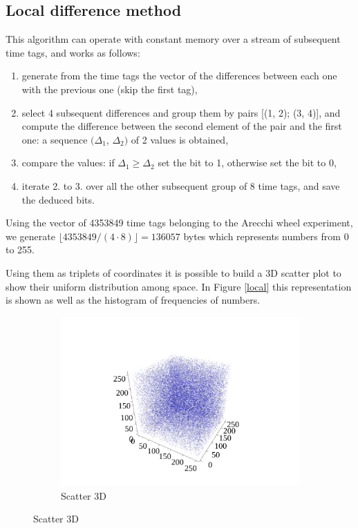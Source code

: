 \documentclass[10pt, final]{article}
\begin{document}
\begin{multicols}{2}
\subsection*{Local difference method}
This algorithm can operate with constant memory over a stream of subsequent time tags, and works as follows:
\begin{enumerate}
    \item generate from the time tags the vector of the differences between each one with the previous one (skip the first tag), 
    \item select 4 subsequent differences and group them by pairs [(1, 2); (3, 4)], and compute the difference between the second element of the pair and the first one: a sequence $(\Delta_1$, $\Delta_2)$ of 2 values is obtained,
    \item compare the values: if $\Delta_1 \geq \Delta_2$ set the bit to 1, otherwise set the bit to 0, 
    \item iterate 2. to 3. over all the other subsequent group of 8 time tags, and save the deduced bits.
\end{enumerate}
Using the vector of 4353849 time tags belonging to the Arecchi wheel experiment, we generate $\lfloor4353849/(4\cdot 8)\rfloor = 136057$ bytes which represents numbers from 0 to 255.

Using them as triplets of coordinates it is possible to build a 3D scatter plot to show their uniform distribution among space. In Figure \ref{local} this representation is shown as well as the histogram of frequencies of numbers.
\begin{mdframed}
    \begin{figure}[H]
        \begin{subfigure}{\textwidth}
            \centering
            \includegraphics[width = \textwidth]{../random_img/d2-scatter3d.pdf}
            \caption{Scatter 3D}
        \end{subfigure}


\end{figure}
\end{mdframed}
\end{multicols}
\end{document}
